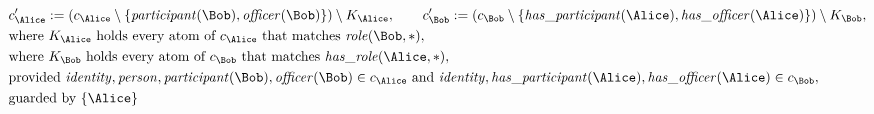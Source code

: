 \begin{align*}
&
c'_
{
\Alice
}
 := 
(c_
{
\Alice
}
 \setminus 
\{
\mathit{\detokenize{
participant
}}
(
\Bob
)
,
\mathit{\detokenize{
officer
}}
(
\Bob
)
\}
) \setminus K_
{
\Alice
}
, \qquad 
c'_
{
\Bob
}
 := 
(c_
{
\Bob
}
 \setminus 
\{
\mathit{\detokenize{
has_participant
}}
(
\Alice
)
,
\mathit{\detokenize{
has_officer
}}
(
\Alice
)
\}
) \setminus K_
{
\Bob
}
,\\
&
\text{where } K_
{
\Alice
}
 \text{ holds every atom of } c_
{
\Alice
}
 \text{ that matches } 
\mathit{\detokenize{
role
}}
(
\Bob
,
\ast
)
,\\
&
\text{where } K_
{
\Bob
}
 \text{ holds every atom of } c_
{
\Bob
}
 \text{ that matches } 
\mathit{\detokenize{
has_role
}}
(
\Alice
,
\ast
)
,\\
&
\text{provided } 
\mathit{\detokenize{
identity
}}
,
\mathit{\detokenize{
person
}}
,
\mathit{\detokenize{
participant
}}
(
\Bob
)
,
\mathit{\detokenize{
officer
}}
(
\Bob
)
 \in c_
{
\Alice
}
 \text{ and } 
\mathit{\detokenize{
identity
}}
,
\mathit{\detokenize{
has_participant
}}
(
\Alice
)
,
\mathit{\detokenize{
has_officer
}}
(
\Alice
)
 \in c_
{
\Bob
}
,\\
&
\text{guarded by } \{
\Alice
\}
\end{align*}

